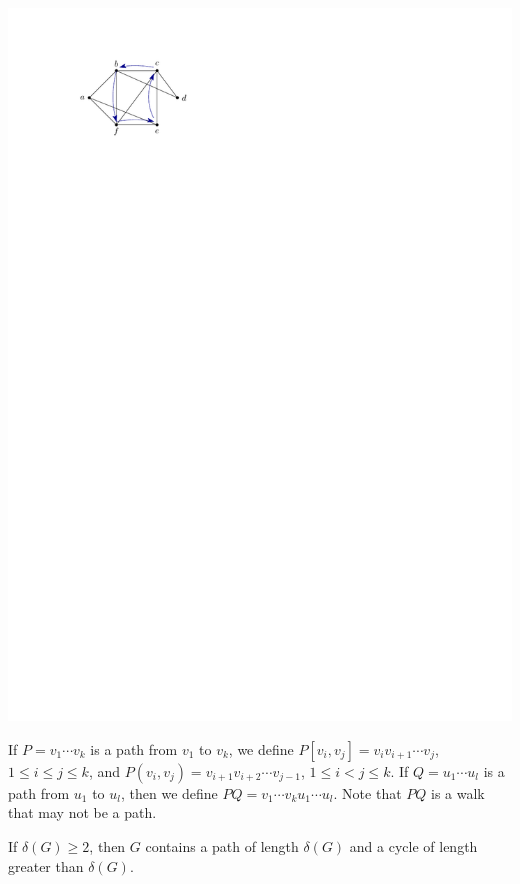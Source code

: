 \begin{Example}
\begin{center}
\includegraphics{Images/Cycle1.pdf}
\end{center}
\end{Example}

If $P = v_1 \cdots v_k$ is a path from $v_1$ to $v_k$, we define $P[v_i, v_j] = v_i v_{i+1} \cdots v_j$, $1 \le i \le j \le k$, and $P(v_i, v_j) = v_{i+1} v_{i+2} \cdots v_{j-1}$, $1 \le i < j \le k$. If $Q = u_1 \cdots u_l$ is a path from $u_1$ to $u_l$, then we define $PQ = v_1 \cdots v_k u_1 \cdots u_l$. Note that $PQ$ is a walk that may not be a path.

\begin{Theorem}\label{thm:deltaGPath}
If $\delta(G) \ge 2$, then $G$ contains a path of length $\delta(G)$ and a cycle of length greater than $\delta(G)$.
\end{Theorem}

